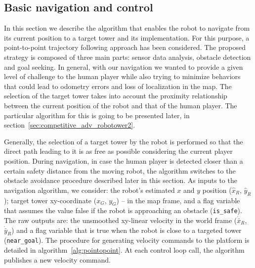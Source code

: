 \subsection{Basic navigation and control}
In this section we describe the algorithm that enables the robot to navigate from its current position to a target tower and its implementation. For this purpose, a point-to-point trajectory following approach has been considered. The proposed strategy is composed of three main parts: sensor data analysis, obstacle detection and goal seeking. In general, with our navigation we wanted to provide a given level of challenge to the human player while also trying to minimize behaviors that could lead to odometry errors and loss of localization in the map. The selection of the target tower takes into account the proximity relationship between the current position of the robot and that of the human player. The particular algorithm for this is going to be presented later, in section~\ref{sec:competitive_adv_robotower2}.

Generally, the selection of a target tower by the robot is performed so that the direct path leading to it is as free as possible considering the current player position. 
During navigation, in case the human player is detected closer than a certain safety distance from the moving robot, the algorithm switches to the obstacle avoidance procedure described later in this section. As inputs to the navigation algorithm, we consider: the robot's estimated $x$ and $y$ position ($\hat{x}_R$, $\hat{y}_R$); target tower xy-coordinate ($x_G$, $y_G$) -- in the map frame, and a flag variable that assumes the value false if the robot is approaching an obstacle (\verb|is_safe|). The raw outputs are: the unsmoothed xy-linear velocity in the world frame ($\dot{\bar{x}}_R$, $\dot{\bar{y}}_R$) and a flag variable that is true when the robot is close to a targeted tower (\verb|near_goal|). The procedure for generating velocity commands to the platform is detailed in algorithm~\ref{alg:pointopoint}. At each control loop call, the algorithm publishes a new velocity command.

